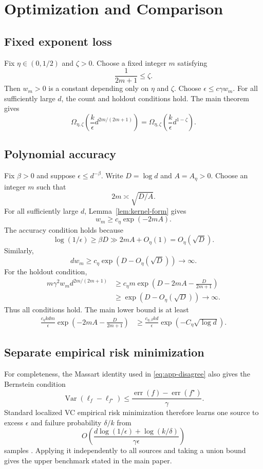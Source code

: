 \documentclass[twoside]{article}
\newcommand{\err}{\operatorname{err}}
\newcommand{\1}{\mathbf 1}
\begin{document}
\section{Optimization and Comparison}
\label{app:optimization}

\subsection{Fixed exponent loss}

Fix $\eta\in(0,1/2)$ and $\zeta>0$. Choose a fixed integer $m$ satisfying
\[
 \frac1{2m+1}\le\zeta.
\]
Then $w_m>0$ is a constant depending only on $\eta$ and $\zeta$. Choose
$\epsilon\le c\gamma w_m$. For all sufficiently large $d$, the count and
holdout conditions hold. The main theorem gives
\[
 \Omega_{\eta,\zeta}\!\left(
 \frac{k}{\epsilon}d^{2m/(2m+1)}
 \right)
 =\Omega_{\eta,\zeta}\!\left(
 \frac{k}{\epsilon}d^{1-\zeta}
 \right).
\]

\subsection{Polynomial accuracy}

Fix $\beta>0$ and suppose $\epsilon\le d^{-\beta}$. Write
$D=\log d$ and $A=A_\eta>0$. Choose an integer $m$ such that
\begin{equation}
 2m\asymp\sqrt{D/A}.
 \label{eq:app-m-choice}
\end{equation}
For all sufficiently large $d$, Lemma~\ref{lem:kernel-form} gives
\[
 w_m\ge c_\eta\exp(-2mA).
\]
The accuracy condition holds because
\[
 \log(1/\epsilon)\ge\beta D
 \gg2mA+O_\eta(1)=O_\eta(\sqrt D).
\]
Similarly,
\[
 dw_m\ge c_\eta\exp(D-O_\eta(\sqrt D))\longrightarrow\infty.
\]
For the holdout condition,
\begin{align*}
 m\gamma^2w_m d^{2m/(2m+1)}
 &\ge c_\eta m\exp\left(
 D-2mA-\frac{D}{2m+1}
 \right)\\
 &\ge\exp(D-O_\eta(\sqrt D))\longrightarrow\infty.
\end{align*}
Thus all conditions hold. The main lower bound is at least
\begin{align*}
 \frac{c_\eta kdm}{\epsilon}
 \exp\left(-2mA-\frac{D}{2m+1}\right)
 &\ge\frac{c_{\eta,\beta}kd}{\epsilon}
 \exp(-C_\eta\sqrt{\log d}).
\end{align*}

\subsection{Separate empirical risk minimization}

For completeness, the Massart identity used in
\eqref{eq:app-disagree} also gives the Bernstein condition
\[
 \operatorname{Var}(\ell_f-\ell_{f^\star})
 \le\frac{\err(f)-\err(f^\star)}{\gamma}.
\]
Standard localized VC empirical risk minimization therefore learns one
source to excess $\epsilon$ and failure probability $\delta/k$ from
\[
 O\!\left(
 \frac{d\log(1/\epsilon)+\log(k/\delta)}{\gamma\epsilon}
 \right)
\]
samples \citep{boucheron2005classification,massart2006risk}. Applying it
independently to all sources and taking a union bound gives the upper
benchmark stated in the main paper.


\end{document}
